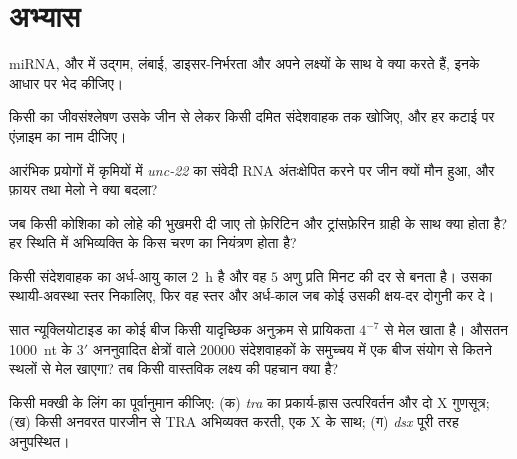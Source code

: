 \section{अभ्यास}

\begin{exercise}[$\star$]\label{exo:b3:rna-regulation:1}
miRNA,  और  में उद्गम, लंबाई, डाइसर-निर्भरता और अपने लक्ष्यों
के साथ वे क्या करते हैं, इनके आधार पर भेद कीजिए।
\end{exercise}

\begin{exercise}[$\star$]\label{exo:b3:rna-regulation:2}
किसी  का जीवसंश्लेषण उसके जीन से लेकर किसी दमित संदेशवाहक तक
खोजिए, और हर कटाई पर एंज़ाइम का नाम दीजिए।
\end{exercise}

\begin{exercise}[$\star$]\label{exo:b3:rna-regulation:3}
आरंभिक प्रयोगों में कृमियों में \emph{unc-22} का संवेदी RNA अंतःक्षेपित
करने पर जीन क्यों मौन हुआ, और फ़ायर तथा मेलो ने क्या बदला?
\end{exercise}

\begin{exercise}[$\star$]\label{exo:b3:rna-regulation:4}
जब किसी कोशिका को लोहे की भुखमरी दी जाए तो फ़ेरिटिन और ट्रांसफ़ेरिन
ग्राही के साथ क्या होता है? हर स्थिति में अभिव्यक्ति के किस चरण का
नियंत्रण होता है?
\end{exercise}

\begin{exercise}[$\star\star$]\label{exo:b3:rna-regulation:5}
किसी संदेशवाहक का अर्ध-आयु काल \qty{2}{h} है और वह $5$
अणु प्रति मिनट की दर से बनता है। उसका स्थायी-अवस्था स्तर निकालिए, फिर
वह स्तर और अर्ध-काल जब कोई  उसकी क्षय-दर दोगुनी कर दे।
\end{exercise}

\begin{exercise}[$\star\star$]\label{exo:b3:rna-regulation:6}
सात न्यूक्लियोटाइड का कोई बीज किसी यादृच्छिक अनुक्रम से प्रायिकता
$4^{-7}$ से मेल खाता है। औसतन \qty{1000}{nt} के 3$'$ अननुवादित
क्षेत्रों वाले \num{20000} संदेशवाहकों के समुच्चय में एक 
बीज संयोग से कितने स्थलों से मेल खाएगा? तब किसी वास्तविक लक्ष्य की
पहचान क्या है?
\end{exercise}

\begin{exercise}[$\star\star$]\label{exo:b3:rna-regulation:7}
किसी मक्खी के लिंग का पूर्वानुमान कीजिए: (क) \emph{tra} का
प्रकार्य-ह्रास उत्परिवर्तन और दो X गुणसूत्र; (ख) किसी अनवरत पारजीन से
TRA अभिव्यक्त करती, एक X के साथ; (ग) \emph{dsx} पूरी तरह अनुपस्थित।
\end{exercise}

